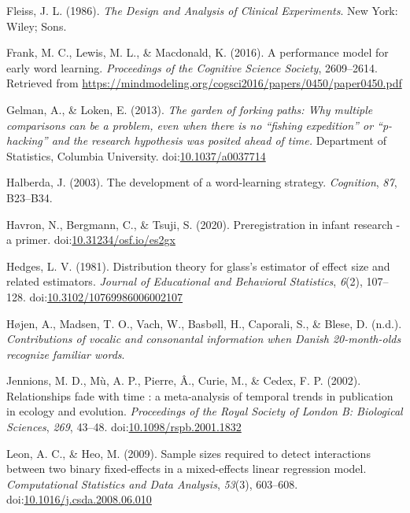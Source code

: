 \documentclass[
  man, noextraspace]{apa6}
\begin{document}
\leavevmode\hypertarget{ref-Fleiss1986}{}%
Fleiss, J. L. (1986). \emph{The Design and Analysis of Clinical Experiments}. New York: Wiley; Sons.

\leavevmode\hypertarget{ref-Frank2016}{}%
Frank, M. C., Lewis, M. L., \& Macdonald, K. (2016). A performance model for early word learning. \emph{Proceedings of the Cognitive Science Society}, 2609--2614. Retrieved from \url{https://mindmodeling.org/cogsci2016/papers/0450/paper0450.pdf}

\leavevmode\hypertarget{ref-Gelman2013}{}%
Gelman, A., \& Loken, E. (2013). \emph{The garden of forking paths: Why multiple comparisons can be a problem, even when there is no ``fishing expedition'' or ``p-hacking'' and the research hypothesis was posited ahead of time.} Department of Statistics, Columbia University. doi:\href{https://doi.org/10.1037/a0037714}{10.1037/a0037714}

\leavevmode\hypertarget{ref-Halberda2003}{}%
Halberda, J. (2003). The development of a word-learning strategy. \emph{Cognition}, \emph{87}, B23--B34.

\leavevmode\hypertarget{ref-Havron}{}%
Havron, N., Bergmann, C., \& Tsuji, S. (2020). Preregistration in infant research - a primer. doi:\href{https://doi.org/10.31234/osf.io/es2gx}{10.31234/osf.io/es2gx}

\leavevmode\hypertarget{ref-Hedges1981}{}%
Hedges, L. V. (1981). Distribution theory for glass's estimator of effect size and related estimators. \emph{Journal of Educational and Behavioral Statistics}, \emph{6}(2), 107--128. doi:\href{https://doi.org/10.3102/10769986006002107}{10.3102/10769986006002107}

\leavevmode\hypertarget{ref-Hojen}{}%
Højen, A., Madsen, T. O., Vach, W., Basbøll, H., Caporali, S., \& Blese, D. (n.d.). \emph{Contributions of vocalic and consonantal information when Danish 20-month-olds recognize familiar words}.

\leavevmode\hypertarget{ref-Jennions2002}{}%
Jennions, M. D., Mù, A. P., Pierre, Â., Curie, M., \& Cedex, F. P. (2002). Relationships fade with time : a meta-analysis of temporal trends in publication in ecology and evolution. \emph{Proceedings of the Royal Society of London B: Biological Sciences}, \emph{269}, 43--48. doi:\href{https://doi.org/10.1098/rspb.2001.1832}{10.1098/rspb.2001.1832}

\leavevmode\hypertarget{ref-Leon2009}{}%
Leon, A. C., \& Heo, M. (2009). Sample sizes required to detect interactions between two binary fixed-effects in a mixed-effects linear regression model. \emph{Computational Statistics and Data Analysis}, \emph{53}(3), 603--608. doi:\href{https://doi.org/10.1016/j.csda.2008.06.010}{10.1016/j.csda.2008.06.010}
\end{document}
